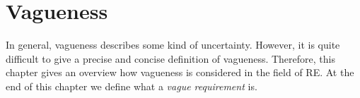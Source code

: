 \section{Vagueness}
\label{chp:fundamentals:sec:vagueness}
In general, vagueness describes some kind of uncertainty.
However, it is quite difficult to give a precise and concise definition of vagueness.
Therefore, this chapter gives an overview how vagueness is considered in the field of \ac{RE}.
At the end of this chapter we define what a \textit{vague requirement} is.





